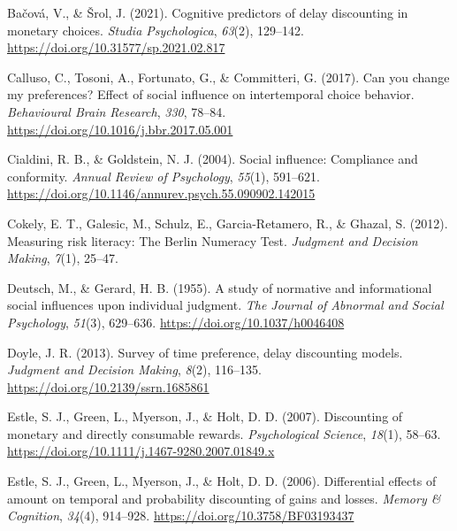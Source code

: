 \documentclass[
  pub,floatsintext]{apa6}
\newlength{\cslhangindent}
\newlength{\cslentryspacingunit} %
\newenvironment{CSLReferences}[2] %
 {%
  \setlength{\parindent}{0pt}
  \ifodd #1
  \let\oldpar\par
  \def\par{\hangindent=\cslhangindent\oldpar}
  \fi
  \setlength{\parskip}{#2\cslentryspacingunit}
 }%
 {}
\begin{document}
\scriptsize

\hypertarget{refs}{}
\begin{CSLReferences}{1}{0}
\leavevmode{}%
Bačová, V., \& Šrol, J. (2021). Cognitive predictors of delay discounting in monetary choices. \emph{Studia Psychologica}, \emph{63}(2), 129--142. \url{https://doi.org/10.31577/sp.2021.02.817}

\leavevmode{}%
Calluso, C., Tosoni, A., Fortunato, G., \& Committeri, G. (2017). Can you change my preferences? {Effect} of social influence on intertemporal choice behavior. \emph{Behavioural Brain Research}, \emph{330}, 78--84. \url{https://doi.org/10.1016/j.bbr.2017.05.001}

\leavevmode{}%
Cialdini, R. B., \& Goldstein, N. J. (2004). Social influence: {Compliance} and conformity. \emph{Annual Review of Psychology}, \emph{55}(1), 591--621. \url{https://doi.org/10.1146/annurev.psych.55.090902.142015}

\leavevmode{}%
Cokely, E. T., Galesic, M., Schulz, E., Garcia-Retamero, R., \& Ghazal, S. (2012). Measuring risk literacy: {The} {Berlin} {Numeracy} {Test}. \emph{Judgment and Decision Making}, \emph{7}(1), 25--47.

\leavevmode{}%
Deutsch, M., \& Gerard, H. B. (1955). A study of normative and informational social influences upon individual judgment. \emph{The Journal of Abnormal and Social Psychology}, \emph{51}(3), 629--636. \url{https://doi.org/10.1037/h0046408}

\leavevmode{}%
Doyle, J. R. (2013). Survey of time preference, delay discounting models. \emph{Judgment and Decision Making}, \emph{8}(2), 116--135. \url{https://doi.org/10.2139/ssrn.1685861}

\leavevmode{}%
Estle, S. J., Green, L., Myerson, J., \& Holt, D. D. (2007). Discounting of monetary and directly consumable rewards. \emph{Psychological Science}, \emph{18}(1), 58--63. \url{https://doi.org/10.1111/j.1467-9280.2007.01849.x}

\leavevmode{}%
Estle, S. J., Green, L., Myerson, J., \& Holt, D. D. (2006). Differential effects of amount on temporal and probability discounting of gains and losses. \emph{Memory \& Cognition}, \emph{34}(4), 914--928. \url{https://doi.org/10.3758/BF03193437}


\end{CSLReferences}
\end{document}
